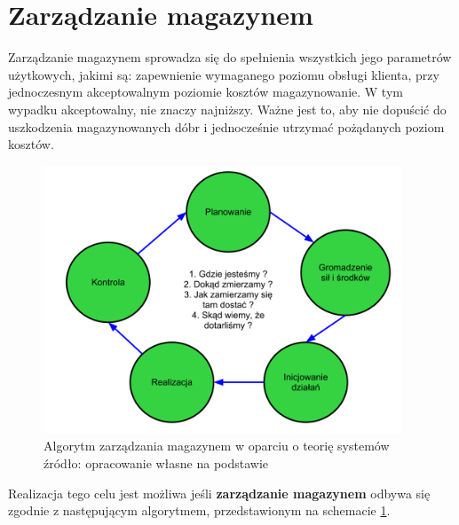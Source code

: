 \section{Zarządzanie magazynem}
	Zarządzanie magazynem sprowadza się do spełnienia wszystkich jego parametrów użytkowych, jakimi są:
	zapewnienie wymaganego poziomu obsługi klienta, przy jednoczesnym akceptowalnym poziomie kosztów magazynowanie.
	W tym wypadku akceptowalny, nie znaczy najniższy. Ważne jest to, aby nie dopuścić do uszkodzenia magazynowanych
	dóbr i jednocześnie utrzymać pożądanych poziom kosztów.
	\begin{figure}[h]
		\begin{center}
			\includegraphics[width=0.95\textwidth]{images/warehouse_management_algorithm}
		\end{center}
		\caption[Algorytm zarządzania magazynem]{
			Algorytm zarządzania magazynem w oparciu o teorię systemów \\
			źródło: opracowanie własne na podstawie \cite{PZMW}
		}
		\label{fig:warehouse_management_algorithm}
	\end{figure}
	Realizacja tego celu jest możliwa jeśli \textbf{zarządzanie magazynem} odbywa się zgodnie z następującym algorytmem,
	przedstawionym na schemacie \ref{fig:warehouse_management_algorithm}.\\
	
